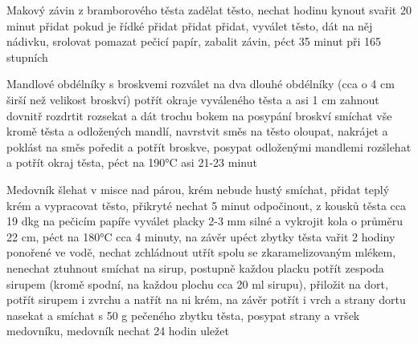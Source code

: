 \documentclass[12pt,a4paper]{article}
\begin{document}
\begin{recipe}{Makový závin z bramborového těsta}
   zadělat těsto, nechat hodinu kynout
   svařit 20 minut
   přidat pokud je řídké
   přidat
   přidat
   přidat, vyválet těsto, dát na něj nádivku, srolovat
   pomazat pečicí papír, zabalit závin, péct 35 minut při 165 stupních
\end{recipe}
\newpage

\begin{recipe}{Mandlové obdélníky s broskvemi}
   rozválet na dva dlouhé obdélníky (cca o 4 cm širší než velikost broskví)
   potřít okraje vyváleného těsta a asi 1 cm zahnout dovnitř
   rozdrtit
   rozsekat a dát trochu bokem na posypání broskví
   smíchat vše kromě těsta a odložených mandlí, navrstvit směs na těsto
   oloupat, nakrájet a poklást na směs
   poředit a potřít broskve, posypat odloženými mandlemi
   rozšlehat a potřít okraj těsta, péct na 190°C asi 21-23 minut
\end{recipe}
\newpage

\begin{recipe}{Medovník}
   šlehat v misce nad párou, krém nebude hustý
   smíchat, přidat teplý krém a vypracovat těsto, přikryté nechat 5 minut odpočinout, z kousků těsta cca 19 dkg na pečicím papíře vyválet placky 2-3 mm silné a vykrojit kola o průměru 22 cm, péct na 180°C cca 4 minuty, na závěr upéct zbytky těsta
   vařit 2 hodiny ponořené ve vodě, nechat zchládnout
   utřít spolu se zkaramelizovaným mlékem, nenechat ztuhnout
   smíchat na sirup, postupně každou placku potřít zespoda sirupem (kromě spodní, na každou plochu cca 20 ml sirupu), přiložit na dort, potřít sirupem i zvrchu a natřít na ni krém, na závěr potřít i vrch a strany dortu
   nasekat a smíchat s 50 g pečeného zbytku těsta, posypat strany a vršek medovníku, medovník nechat 24 hodin uležet
\end{recipe}
\newpage
\end{document}
